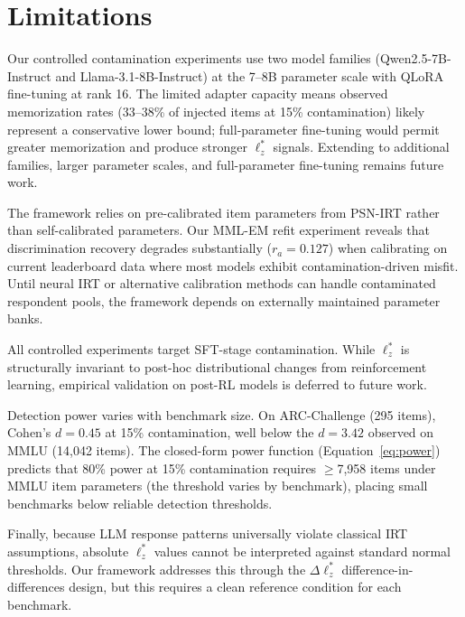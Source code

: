 \section*{Limitations}

Our controlled contamination experiments use two model families (Qwen2.5-7B-Instruct and Llama-3.1-8B-Instruct) at the 7--8B parameter scale with QLoRA fine-tuning at rank 16. The limited adapter capacity means observed memorization rates (33--38\% of injected items at 15\% contamination) likely represent a conservative lower bound; full-parameter fine-tuning would permit greater memorization and produce stronger $\ell_z^*$ signals. Extending to additional families, larger parameter scales, and full-parameter fine-tuning remains future work.

The framework relies on pre-calibrated item parameters from PSN-IRT rather than self-calibrated parameters. Our MML-EM refit experiment reveals that discrimination recovery degrades substantially ($r_a = 0.127$) when calibrating on current leaderboard data where most models exhibit contamination-driven misfit. Until neural IRT or alternative calibration methods can handle contaminated respondent pools, the framework depends on externally maintained parameter banks.

All controlled experiments target SFT-stage contamination. While $\ell_z^*$ is structurally invariant to post-hoc distributional changes from reinforcement learning, empirical validation on post-RL models is deferred to future work.

Detection power varies with benchmark size. On ARC-Challenge (295 items), Cohen's $d = 0.45$ at 15\% contamination, well below the $d = 3.42$ observed on MMLU (14,042 items). The closed-form power function (Equation~\ref{eq:power}) predicts that 80\% power at 15\% contamination requires $\geq$7,958 items under MMLU item parameters (the threshold varies by benchmark), placing small benchmarks below reliable detection thresholds.

Finally, because LLM response patterns universally violate classical IRT assumptions, absolute $\ell_z^*$ values cannot be interpreted against standard normal thresholds. Our framework addresses this through the $\Delta\ell_z^*$ difference-in-differences design, but this requires a clean reference condition for each benchmark.